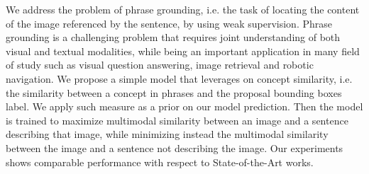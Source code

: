 
We address the problem of phrase grounding, i.e. the task of locating
the content of the image referenced by the sentence, by using weak
supervision. Phrase grounding is a challenging problem that requires
joint understanding of both visual and textual modalities, while being
an important application in many field of study such as visual
question answering, image retrieval and robotic navigation. We propose
a simple model that leverages on concept similarity, i.e. the
similarity between a concept in phrases and the proposal bounding
boxes label. We apply such measure as a prior on our model prediction.
Then the model is trained to maximize multimodal similarity between an
image and a sentence describing that image, while minimizing instead
the multimodal similarity between the image and a sentence not
describing the image. Our experiments shows comparable performance
with respect to State-of-the-Art works.